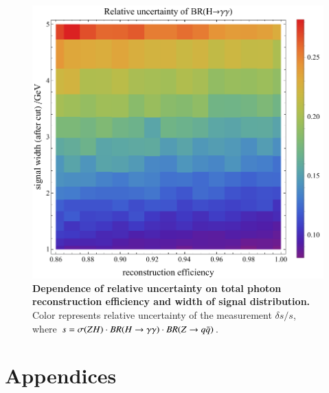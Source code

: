 \documentclass[11pt,a4paper]{cepcnote}
\newcommand{\Zqq}{Z\rightarrow q\bar q}
\newcommand{\PRZH}{\sigma(ZH)}
\newcommand{\qt}{\PRZH\cdot BR(\Hgg)\cdot BR(\Zqq)}
\begin{document}
\begin{figure}[h]
	\includegraphics[scale=0.7,clip]{uncertainty.pdf}
	\centering
	\caption{\textbf{Dependence of relative uncertainty on total photon reconstruction efficiency and width of signal distribution.} Color represents relative uncertainty of the measurement $\delta s/s$, where $s=\qt$.}
	\label{fig:uncertainty}
\end{figure}




\newpage
\appendix
\part*{Appendices}
\end{document}
